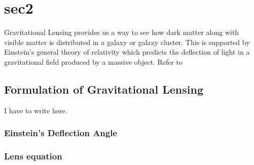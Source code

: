 \documentclass[../main.tex]{subfiles}
\begin{document}
\section{sec2}
Gravitational Lensing provides us a way
to see how dark matter along with visible matter is distributed
in a galaxy or galaxy cluster.
This is supported by Einstein's general theory of relativity
which predicts the deflection of light in a gravitational field
produced by a massive object. Refer to \cite{fabian12}

\subsection{ Formulation of Gravitational Lensing}\label{subsec:lensing}
I have to write here.

\subsubsection{Einstein's Deflection Angle}\label{subsubsec:deflection}
\subsubsection{Lens equation}\label{subsusb:lens_eq}
% 



\newpage


\end{document}

